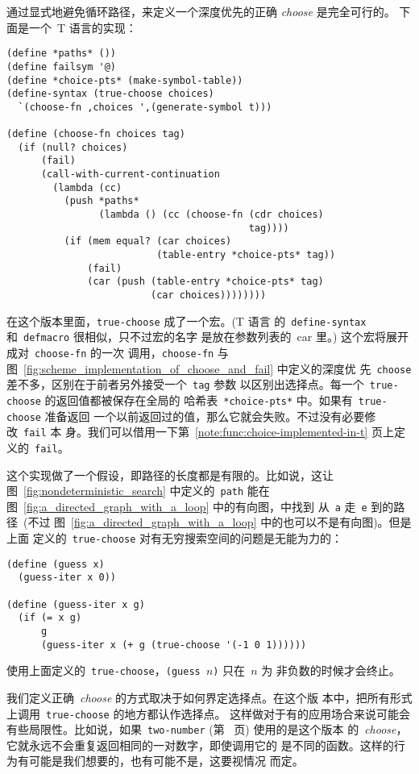 \begin{notes}
  通过显式地避免循环路径，来定义一个深度优先的正确 \emph{choose} 是完全可行的。
  下面是一个~T 语言的实现：
\begin{verbatim}
(define *paths* ())
(define failsym '@)
(define *choice-pts* (make-symbol-table))
(define-syntax (true-choose choices)
  `(choose-fn ,choices ',(generate-symbol t)))

(define (choose-fn choices tag)
  (if (null? choices)
      (fail)
      (call-with-current-continuation
        (lambda (cc)
          (push *paths*
                (lambda () (cc (choose-fn (cdr choices)
                                          tag))))
          (if (mem equal? (car choices)
                          (table-entry *choice-pts* tag))
              (fail)
              (car (push (table-entry *choice-pts* tag)
                         (car choices))))))))
\end{verbatim}
\label{func:true-choice}
  在这个版本里面，\texttt{true-choose} 成了一个宏。(T 语言
  的~\texttt{define-syntax} 和~\texttt{defmacro} 很相似，只不过宏的名字
  是放在参数列表的~car 里。) 这个宏将展开成对~\texttt{choose-fn} 的一次
  调用，\texttt{choose-fn} 与
  图~\ref{fig:scheme_implementation_of_choose_and_fail} 中定义的深度优
  先~\texttt{choose} 差不多，区别在于前者另外接受一个~\texttt{tag} 参数
  以区别出选择点。每一个~\texttt{true-choose} 的返回值都被保存在全局的
  哈希表~\texttt{*choice-pts*} 中。如果有~\texttt{true-choose} 准备返回
  一个以前返回过的值，那么它就会失败。不过没有必要修改~\texttt{fail} 本
  身。我们可以借用一下第~\ref{note:func:choice-implemented-in-t} 页上定
  义的~\texttt{fail}。
  
  这个实现做了一个假设，即路径的长度都是有限的。比如说，这让
  图~\ref{fig:nondeterministic_search} 中定义的~\texttt{path} 能在
  图~\ref{fig:a_directed_graph_with_a_loop} 中的有向图，中找到
  从~\texttt{a} 走~\texttt{e} 到的路径~(不过
  图~\ref{fig:a_directed_graph_with_a_loop} 中的也可以不是有向图)。但是上面
  定义的~\texttt{true-choose} 对有无穷搜索空间的问题是无能为力的：
\begin{verbatim}
(define (guess x)
  (guess-iter x 0))

(define (guess-iter x g)
  (if (= x g)
      g
      (guess-iter x (+ g (true-choose '(-1 0 1))))))
\end{verbatim}
  
  使用上面定义的~\texttt{true-choose}，\texttt{(guess $n$)} 只在~$n$ 为
  非负数的时候才会终止。
  
  我们定义正确~\emph{choose} 的方式取决于如何界定选择点。在这个版
  本中，把所有形式上调用~\texttt{true-choose} 的地方都认作选择点。
  这样做对于有的应用场合来说可能会有些局限性。比如说，如果~\texttt{two-number} 
  (第~\pageref{fig:choice_in_a_subroutine} 页) 使用的是这个版本
  的~\emph{choose}，它就永远不会重复返回相同的一对数字，即使调用它的
  是不同的函数。这样的行为有可能是我们想要的，也有可能不是，这要视情况
  而定。
  

\end{notes}
